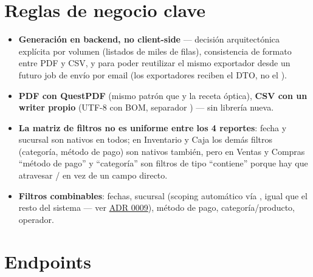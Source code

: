\section{Reglas de negocio clave}
\label{sec:reportes-reglas}

\begin{itemize}
  \item \textbf{Generación en backend, no client-side} --- decisión arquitectónica explícita por volumen (listados de miles de filas), consistencia de formato entre PDF y CSV, y para poder reutilizar el mismo exportador desde un futuro job de envío por email (los exportadores reciben el DTO, no el ).
  \item \textbf{PDF con QuestPDF} (mismo patrón que \allowbreak {}\allowbreak {}\allowbreak {} y la receta óptica), \textbf{CSV con un writer propio} (UTF-8 con BOM, separador \code{;}) --- sin librería nueva.
  \item \textbf{La matriz de filtros no es uniforme entre los 4 reportes}: fecha y sucursal son nativos en todos; en Inventario y Caja los demás filtros (categoría, método de pago) son nativos también, pero en Ventas y Compras ``método de pago'' y ``categoría'' son filtros de tipo ``contiene'' porque hay que atravesar / en vez de un campo directo.
  \item \textbf{Filtros combinables}: fechas, sucursal (scoping automático vía \allowbreak {}\allowbreak {}, igual que el resto del sistema --- ver \hyperref[adr:0009]{ADR 0009}), método de pago, categoría/producto, operador.
\end{itemize}

\section{Endpoints}
\label{sec:reportes-endpoints}


